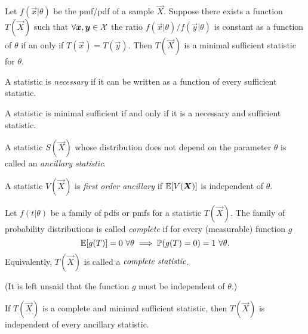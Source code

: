 \begin{theorem}
    Let $f(\vec{x} \vert{} \theta)$ be the pmf/pdf of a sample $\vec{X}$. Suppose there exists a function $T(\vec{X})$ such that $\forall \bm{x}, \bm{y} \in \mathcal{X}{}$ the ratio $f(\vec{x}\vert{}\theta)/f(\vec{y}\vert{}\theta)$ is constant as a function of $\theta$ if an only if $T(\vec{x}) = T(\vec{y})$. Then $T(\vec{X})$ is a minimal sufficient statistic for $\theta$.
\end{theorem}

\begin{definition}
    A statistic is \emph{necessary} if it can be written as a function of every sufficient statistic.
\end{definition}

\begin{theorem}
    A statistic is minimal sufficient if and only if it is a necessary and sufficient statistic.
\end{theorem}

\begin{definition}
    A statistic $S(\vec{X})$ whose distribution does not depend on the parameter $\theta$ is called an \emph{ancillary statistic}.
\end{definition}

\begin{definition}
    A statistic $V(\vec{X})$ is \emph{first order ancillary}  if $\mathbb{E}{}[V(\bm{X})]$ is independent of $\theta$.
\end{definition}

\begin{definition}
    Let $f(t \vert{} \theta)$ be a family of pdfs or pmfs for a statistic $T(\vec{X})$. The family of probability distributions is called \emph{complete} if for every (measurable) function $g$
    \[
        \mathbb{E}{}[g(T)] = 0  \,\, \forall \theta \implies \mathbb{P}{}(g(T) = 0) = 1 \,\, \forall \theta.
        \]
    Equivalently, $T(\vec{X})$ is called a $\emph{complete statistic}$.
\end{definition}

(It is left unsaid that the function $g$ must be independent of $\theta$.)

\begin{theorem}
    If $T(\vec{X})$ is a complete and minimal sufficient statistic, then $T(\vec{X})$ is independent of every ancillary statistic.
\end{theorem}


